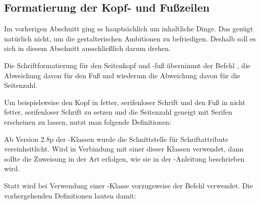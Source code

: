 \subsection{Formatierung der Kopf- und Fußzeilen}
\label{sec:scrpage-de.basics.format}
Im vorherigen Abschnitt ging es hauptsächlich um inhaltliche Dinge.  Das
genügt natürlich nicht, um die gestalterischen Ambitionen zu
befriedigen. Deshalb soll es sich in diesem Abschnitt ausschließlich darum
drehen.

\begin{Declaration}
\end{Declaration}%
Die Schriftformatierung für den Seitenkopf und -fuß übernimmt der Befehl
,  die Abweichung davon für den Fuß und
 wiederum die Abweichung davon für die Seitenzahl.
\begin{Example}
  Um beispielsweise den Kopf in fetter, serifenloser Schrift und den Fuß in
  nicht fetter, serifenloser Schrift zu setzen und die Seitenzahl geneigt
  mit Serifen erscheinen zu lassen, nutzt man folgende Definitionen:
\begin{lstcode}
  \renewcommand*{\headfont}{%
    \normalfont\sffamily\bfseries}
  \renewcommand*{\footfont}{%
    \normalfont\sffamily}
  \renewcommand*{\pnumfont}{%
    \normalfont\rmfamily\slshape}
\end{lstcode}
\end{Example}

\BeginIndexGroup
{}%
%
%
Ab Version 2.8p der \KOMAScript{}-Klassen wurde die Schnittstelle für
Schriftattribute vereinheitlicht.  Wird  in Verbindung mit
einer dieser Klassen verwendet, dann sollte die Zuweisung in der Art erfolgen,
wie sie in der \KOMAScript-Anleitung beschrieben wird.
\begin{Example}
  Statt  wird bei Verwendung einer \KOMAScript-Klasse
  vorzugsweise der Befehl  verwendet. Die vorhergehenden
  Definitionen lauten damit:
\begin{lstcode}
\end{lstcode}
\end{Example}
\EndIndexGroup
\EndIndexGroup


